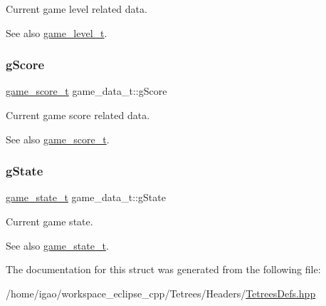 Current game level related data. \begin{DoxySeeAlso}{See also}
\hyperlink{structgame__level__t}{game\+\_\+level\+\_\+t}. 
\end{DoxySeeAlso}
\mbox{\label{structgame__data__t_a70e04b66160685cc84bcdd30edb97e46}} 
\subsubsection{\texorpdfstring{g\+Score}{gScore}}
{\footnotesize\ttfamily \hyperlink{structgame__score__t}{game\+\_\+score\+\_\+t} game\+\_\+data\+\_\+t\+::g\+Score}

Current game score related data. \begin{DoxySeeAlso}{See also}
\hyperlink{structgame__score__t}{game\+\_\+score\+\_\+t}. 
\end{DoxySeeAlso}
\mbox{\label{structgame__data__t_a48253f7b6212e0ff99d5d5960b79476d}} 
\subsubsection{\texorpdfstring{g\+State}{gState}}
{\footnotesize\ttfamily \hyperlink{TetreesDefs_8hpp_aebae08b2e3a36f1452b33acaf1eaab40}{game\+\_\+state\+\_\+t} game\+\_\+data\+\_\+t\+::g\+State}

Current game state. \begin{DoxySeeAlso}{See also}
\hyperlink{TetreesDefs_8hpp_aebae08b2e3a36f1452b33acaf1eaab40}{game\+\_\+state\+\_\+t}. 
\end{DoxySeeAlso}


The documentation for this struct was generated from the following file\+:\begin{DoxyCompactItemize}
\item 
/home/igao/workspace\+\_\+eclipse\+\_\+cpp/\+Tetrees/\+Headers/\hyperlink{TetreesDefs_8hpp}{Tetrees\+Defs.\+hpp}\end{DoxyCompactItemize}
